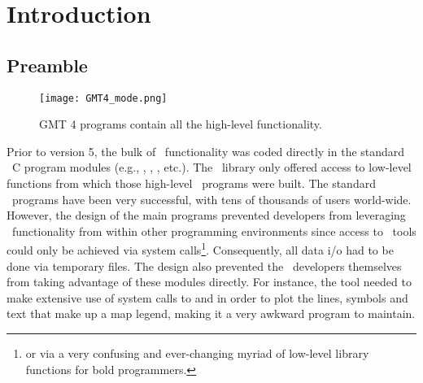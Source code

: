 \documentclass[11pt]{report}
\begin{document}

\clearpage

\tableofcontents

\pagestyle{headings}

\chapter{Introduction}

\section{Preamble}

\begin{figure}[h]
	\centering
	\texttt{[image: GMT4\_mode.png]}
	\caption{GMT 4 programs contain all the high-level functionality.}
\end{figure}
Prior to version 5, the bulk of \GMT\ functionality was coded directly
in the standard \GMT\ C program modules (e.g., , , , etc.).
The \GMT\ library only offered access to low-level functions from which those
high-level \GMT\ programs were built.  The standard \GMT\ programs have been very successful,
with tens of thousands of users world-wide.  However, the design of the main programs
prevented developers from leveraging \GMT\ functionality from within other
programming environments since access to \GMT\ tools could only be achieved
via system calls\footnote{or via a very confusing and ever-changing myriad of
low-level library functions for bold programmers.}.
Consequently, all data i/o had to be done via temporary files.
The design also prevented the \GMT\ developers themselves from taking advantage of these
modules directly.  For instance, the tool  needed to make extensive use of system calls
to  and  in order to plot the lines, symbols and text
that make up a map legend, making it a very awkward program to maintain.
\end{document}
